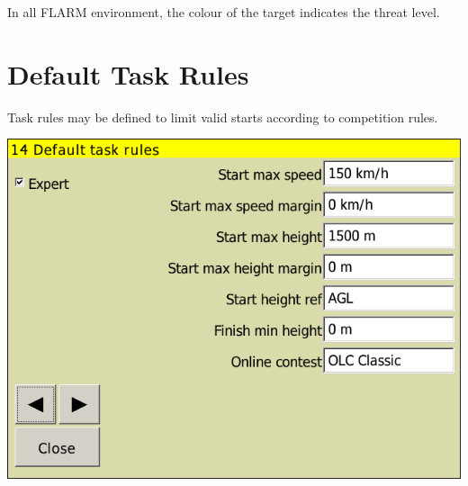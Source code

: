In all FLARM environment, the colour of the target indicates the threat level.


\clearpage
\section{Default Task Rules}
Task rules may be defined to limit valid starts according to competition
rules. \label{conf:taskrules}

\begin{center}
\includegraphics[angle=0,width=0.8\linewidth,keepaspectratio='true']{figures/config-rules.png}
\end{center}

